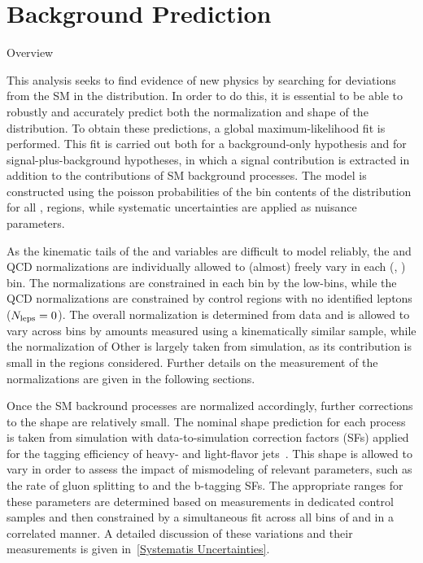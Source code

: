 \chapter{Background Prediction}
\begin{section}{Overview}

This analysis seeks to find evidence of new physics by searching for deviations from the SM in the \Nb distribution.
In order to do this, it is essential to be able to robustly and accurately predict both the normalization and shape of the \Nb distribution.
To obtain these predictions, a global maximum-likelihood fit is performed.
This fit is carried out both for a background-only hypothesis and for signal-plus-background hypotheses, in which a signal contribution is extracted in addition to the contributions of SM background processes.
The model is constructed using the poisson probabilities of the bin contents of the \Nb distribution for all \Njets, \MJ regions, while systematic uncertainties are applied as nuisance parameters.

As the kinematic tails of the \Njets and \MJ variables are difficult to model reliably, the \ttbar and QCD normalizations are individually allowed to (almost) freely vary in each (\Njets, \MJ) bin.
The \ttbar normalizations are constrained in each bin by the low-\Nb bins, while the QCD normalizations are constrained by control regions with no identified leptons ($N_{\mathrm{leps}} = 0$).
The overall \Wjets normalization is determined from data and is allowed to vary across \Njets bins by amounts measured using a kinematically similar \Zjets sample, while the normalization of Other is largely taken from simulation, as its contribution is small in the regions considered.
Further details on the measurement of the normalizations are given in the following sections.

Once the SM backround processes are normalized accordingly, further corrections to the \Nb shape are relatively small.
The nominal \Nb shape prediction for each process is taken from simulation with data-to-simulation correction factors (SFs) applied for the tagging efficiency of heavy- and light-flavor jets~\cite{Chatrchyan:2012jua,BTV-16-002}.
This shape is allowed to vary in order to assess the impact of mismodeling of relevant parameters, such as the rate of gluon splitting to \bbbar and the b-tagging SFs.
The appropriate ranges for these parameters are determined based on measurements in dedicated control samples and then constrained by a simultaneous fit across all bins of \Njets and \MJ in a correlated manner.
A detailed discussion of these variations and their measurements is given in~\ref{Systematis Uncertainties}.

\end{section}

